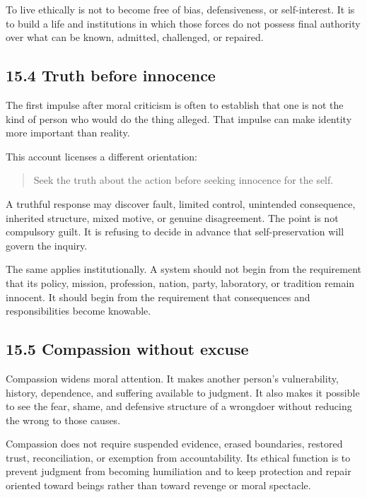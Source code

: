\documentclass[
  11pt,
]{article}
\begin{document}
To live ethically is not to become free of bias, defensiveness, or
self-interest. It is to build a life and institutions in which those
forces do not possess final authority over what can be known, admitted,
challenged, or repaired.

\subsection{15.4 Truth before innocence}\label{truth-before-innocence}

The first impulse after moral criticism is often to establish that one
is not the kind of person who would do the thing alleged. That impulse
can make identity more important than reality.

This account licenses a different orientation:

\begin{quote}
Seek the truth about the action before seeking innocence for the self.
\end{quote}

A truthful response may discover fault, limited control, unintended
consequence, inherited structure, mixed motive, or genuine disagreement.
The point is not compulsory guilt. It is refusing to decide in advance
that self-preservation will govern the inquiry.

The same applies institutionally. A system should not begin from the
requirement that its policy, mission, profession, nation, party,
laboratory, or tradition remain innocent. It should begin from the
requirement that consequences and responsibilities become knowable.

\subsection{15.5 Compassion without
excuse}\label{compassion-without-excuse}

Compassion widens moral attention. It makes another person's
vulnerability, history, dependence, and suffering available to judgment.
It also makes it possible to see the fear, shame, and defensive
structure of a wrongdoer without reducing the wrong to those causes.

Compassion does not require suspended evidence, erased boundaries,
restored trust, reconciliation, or exemption from accountability. Its
ethical function is to prevent judgment from becoming humiliation and to
keep protection and repair oriented toward beings rather than toward
revenge or moral spectacle.
\end{document}
